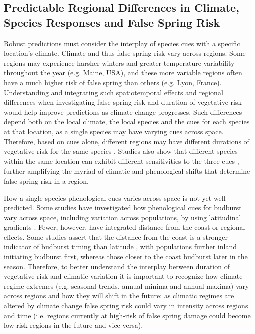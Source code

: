 \documentclass{article}\usepackage[]{graphicx}\usepackage[]{color}
\begin{document}
\subsection* {Predictable Regional Differences in Climate, Species Responses and False Spring Risk}
Robust predictions must consider the interplay of species cues with a specific location's climate. Climate and thus false spring risk vary across regions. Some regions may experience harsher winters and greater temperature variability throughout the year (e.g. Maine, USA), and these more variable regions often have a much higher risk of false spring than others (e.g. Lyon, France). Understanding and integrating such spatiotemporal effects and regional differences when investigating false spring risk and duration of vegetative risk would help improve predictions as climate change progresses. Such differences depend both on the local climate, the local species and the cues for each species at that location, as a single species may have varying cues across space. Therefore, based on cues alone, different regions may have different durations of vegetative risk for the same species \citep {Partanen2004, Viheraaarnio2006, Caffarra2011}. Studies also show that different species within the same location can exhibit different sensitivities to the three cues \citep{Basler2012, Laube2013}, further amplifying the myriad of climatic and phenological shifts that determine false spring risk in a region. 

How a single species phenological cues varies across space is not yet well predicted. Some studies have investigated how phenological cues for budburst vary across space, including variation across populations, by using latitudinal gradients \citep{Sogaard2008, Way2015, Zohner2016, Gauzere2017}. Fewer, however, have integrated distance from the coast \citep [but see][]{Myking2007, Harrington2015, Aitken2015} or regional effects. Some studies assert that the distance from the coast is a stronger indicator of budburst timing than latitude \citep{Myking2007}, with populations further inland initiating budburst first, whereas those closer to the coast budburst later in the season. Therefore, to better understand the interplay between duration of vegetative risk and climatic variation it is important to recognize how climate regime extremes (e.g. seasonal trends, annual minima and annual maxima) vary across regions and how they will shift in the future: as climatic regimes are altered by climate change false spring risk could vary in intensity across regions and time (i.e. regions currently at high-risk of false spring damage could become low-risk regions in the future and vice versa). 
\end{document}
